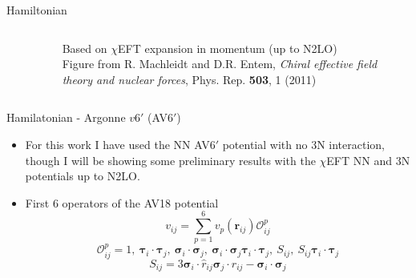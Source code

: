 \documentclass{beamer}
\renewcommand{\r}{\mathbf{r}}
\newcommand{\ti}{\bm{\tau}_i}
\newcommand{\tj}{\bm{\tau}_j}
\newcommand{\si}{\bm{\sigma}_i}
\newcommand{\sj}{\bm{\sigma}_j}
\begin{document}
\begin{frame}{Hamiltonian}
\begin{columns}
\begin{column}{0.5\textwidth}
\begin{figure}
\end{figure}
\end{column}
\begin{column}{0.5\textwidth}
   Based on $\chi$EFT expansion in momentum (up to N2LO)
   {\\ \tiny Figure from R. Machleidt and D.R. Entem, {\it Chiral effective field theory and nuclear forces}, Phys. Rep. {\bf 503}, 1 (2011)}
\end{column}
\end{columns}
\end{frame}

\begin{frame}{Hamilatonian - Argonne $v6'$ (AV6$'$)}
\begin{itemize}
   \item For this work I have used the NN AV6$'$ potential with no 3N interaction, though I will be showing some preliminary results with the $\chi$EFT NN and 3N potentials up to N2LO.
   \item First 6 operators of the AV18 potential
   \begin{equation*}
      v_{ij} = \sum\limits_{p=1}^6 v_p(\r_{ij})\mathcal{O}^p_{ij}
   \end{equation*}
   \begin{equation*}
      \mathcal{O}^p_{ij} = 1,~\ti\cdot\tj,~\si\cdot\sj,~\si\cdot\sj\ti\cdot\tj,~S_{ij},~S_{ij}\ti\cdot\tj
   \end{equation*}
   \begin{equation*}
      S_{ij} = 3\si\cdot\hat{r}_{ij}\sj\cdot\hat{r}_{ij}-\si\cdot\sj
   \end{equation*}
\end{itemize}
\end{frame}
\end{document}
